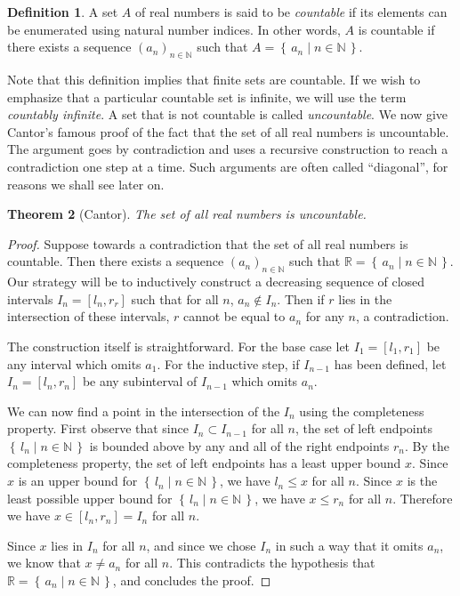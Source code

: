 \documentclass[11pt,oneside]{amsbook}
\newcommand{\set}[1]{\left\{\,#1\,\right\}}
\newcommand{\NN}{\mathbb N}
\newcommand{\RR}{\mathbb R}
\theoremstyle{definition}
\theoremstyle{plain}
\newtheorem{thm}{Theorem}[section]
\theoremstyle{definition}
\newtheorem{defn}[thm]{Definition}
\theoremstyle{remark}
\numberwithin{equation}{section}
\numberwithin{figure}{section}
\begin{document}
\begin{defn}
  A set $A$ of real numbers is said to be \emph{countable} if its elements can be enumerated using natural number indices. In other words, $A$ is countable if there exists a sequence $(a_n)_{n\in\NN}$ such that $A=\set{a_n\mid n\in\NN}$.
\end{defn}

Note that this definition implies that finite sets are countable. If we wish to emphasize that a particular countable set is infinite, we will use the term \emph{countably infinite}. A set that is not countable is called \emph{uncountable}. We now give Cantor's famous proof of the fact that the set of all real numbers is uncountable. The argument goes by contradiction and uses a recursive construction to reach a contradiction one step at a time. Such arguments are often called ``diagonal'', for reasons we shall see later on.

\begin{thm}[Cantor]
  \label{thm:cantor}
  The set of all real numbers is uncountable.
\end{thm}

\begin{proof}
  Suppose towards a contradiction that the set of all real numbers is countable. Then there exists a sequence $(a_n)_{n\in\NN}$ such that $\RR=\set{a_n\mid n\in\NN}$. Our strategy will be to inductively construct a decreasing sequence of closed intervals $I_n=[l_n,r_r]$ such that for all $n$, $a_n\notin I_n$. Then if $r$ lies in the intersection of these intervals, $r$ cannot be equal to $a_n$ for any $n$, a contradiction.

The construction itself is straightforward. For the base case let $I_1=[l_1,r_1]$ be any interval which omits $a_1$. For the inductive step, if $I_{n-1}$ has been defined, let $I_n=[l_n,r_n]$ be any subinterval of $I_{n-1}$ which omits $a_n$.

We can now find a point in the intersection of the $I_n$ using the completeness property. First observe that since $I_n\subset I_{n-1}$ for all $n$, the set of left endpoints $\set{l_n\mid n\in\NN}$ is bounded above by any and all of the right endpoints $r_n$. By the completeness property, the set of left endpoints has a least upper bound $x$. Since $x$ is an upper bound for $\set{l_n\mid n\in\NN}$, we have $l_n\leq x$ for all $n$. Since $x$ is the least possible upper bound for $\set{l_n\mid n\in\NN}$, we have $x\leq r_n$ for all $n$. Therefore we have $x\in[l_n,r_n]=I_n$ for all $n$.

Since $x$ lies in $I_n$ for all $n$, and since we chose $I_n$ in such a way that it omits $a_n$, we know that $x\neq a_n$ for all $n$. This contradicts the hypothesis that $\RR=\set{a_n\mid n\in\NN}$, and concludes the proof.
\end{proof}
\end{document}
